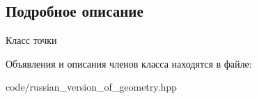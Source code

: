 \subsection{Подробное описание}
Класс точки 

Объявления и описания членов класса находятся в файле\+:\begin{DoxyCompactItemize}
\item 
code/russian\+\_\+version\+\_\+of\+\_\+geometry.\+hpp\end{DoxyCompactItemize}
